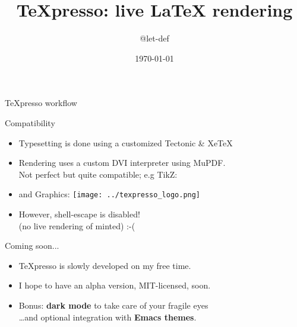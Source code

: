 \documentclass{beamer}
\title{TeXpresso: live \LaTeX{} rendering}
\author{@let-def}
\date{\today}
\begin{document}
\begin{frame}
  \titlepage
\end{frame}

\begin{frame}{TeXpresso workflow}
\end{frame}

\begin{frame}{Compatibility}
  \begin{itemize}
   \item Typesetting is done using a customized Tectonic \& XeTeX
   \item Rendering uses a custom DVI interpreter using MuPDF. \\
    Not perfect but quite compatible; e.g TikZ: \\
   \item and Graphics: \texttt{[image: ../texpresso\_logo.png]}
   \item However, shell-escape is disabled! \\ (no live rendering of minted) :-(
  \end{itemize}
\end{frame}

\begin{frame}{Coming soon...}
  \begin{itemize}
    \item TeXpresso is slowly developed on my free time. \\
    \item I hope to have an alpha version, MIT-licensed, soon.
    \item Bonus: \textbf{dark mode} to take care of your fragile eyes \\
      \ldots and optional integration with \textbf{Emacs themes}.
  \end{itemize}
\end{frame}
\end{document}
